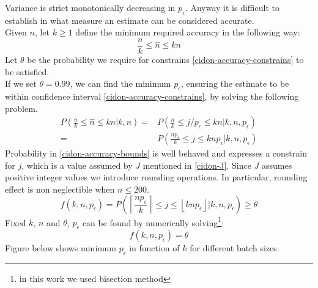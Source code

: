 \documentclass[11pt,a4paper,twoside,openright]{book}
\newcommand{\pc}{p_{\epsilon}}
\begin{document}
Variance is strict monotonically decreasing in $\pc$.
Anyway it is difficult to establish in what measure an estimate can be considered accurate.\\
Given $n$, let $k \geq1$ define the minimum required accuracy in the following way: 
\begin{equation}
\frac{n}{k}\leq\hat{n}\leq kn
\label{cidon-accuracy-constrains}
\end{equation}
Let $\theta$ be the probability we require for constrains \eqref{cidon-accuracy-constrains} to be satisfied.\\
If we set $\theta=0.99$, we can find the minimum $\pc$, ensuring the estimate to be within confidence interval \eqref{cidon-accuracy-constrains}, by solving the following problem.\\
\begin{equation}
\begin{split}
P\left(\frac{n}{k}\leq \hat{n} \leq kn \big| k,n\right)=& P\left(\frac{n}{k}\leq j/\pc \leq kn \big| k,n,\pc\right)\\
=&P\left(\frac{n\pc}{k}\leq j \leq kn\pc \big| k,n,\pc\right)
\end{split}
\label{cidon-accuracy-bounds}
\end{equation}
Probability in \eqref{cidon-accuracy-bounds} is well behaved and expresses a constrain for $j$, which is a value assumed by $J$ mentioned in \eqref{cidon-J}. Since $J$ assumes positive integer values we introduce rounding operations. In particular, rounding effect is non neglectible when $n\leq 200$.  \\
\begin{equation}
f(k,n,\pc) = P\left(\left\lceil \frac{n\pc}{k}\right\rceil\leq j \leq \left\lfloor kn\pc\right\rfloor \big| k,n,\pc\right)\geq \theta
\end{equation}
Fixed $k$, $n$ and $\theta$, $\pc$ can be found by numerically solving\footnote{in this work we used bisection method}:
\begin{equation}
f(k,n,\pc) = \theta
\end{equation}
Figure below shows minimum $\pc$ in function of $k$ for different batch sizes.\\
\end{document}
